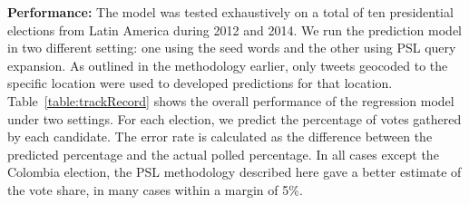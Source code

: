 \noindent
{\bf Performance:}
The model was tested exhaustively on a total of ten presidential elections from Latin America during 2012 and 2014. We run the prediction model in two different setting: one using the 
seed words and the other using PSL query expansion.
As outlined in the methodology earlier, only tweets geocoded to the specific location were
used to developed predictions for that location.
Table~\ref{table:trackRecord} shows the overall performance of the regression model under two settings. For each election, we predict the percentage of votes
gathered by each candidate. The error rate is calculated as the difference between the predicted
percentage and the actual polled percentage.
In all cases except the Colombia election, the PSL methodology described here gave a better
estimate of the vote share, in many cases within a margin of 5\%.
